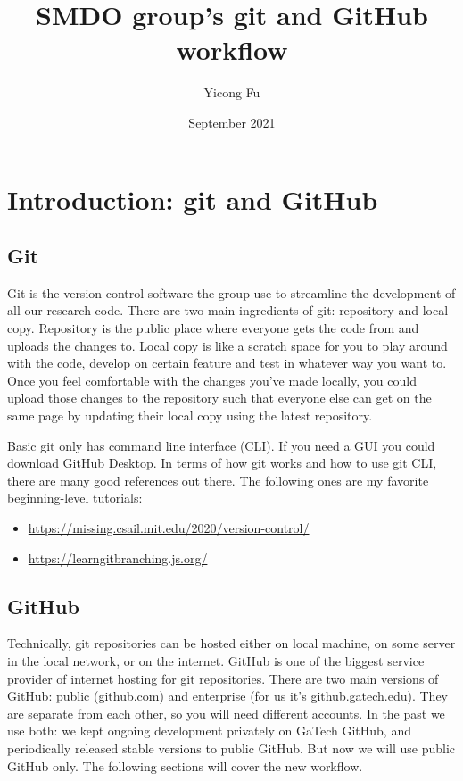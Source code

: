 \documentclass{article}
\title{SMDO group's git and GitHub workflow}
\author{Yicong Fu}
\date{September 2021}
\begin{document}
\maketitle

\section{Introduction: git and GitHub}

\subsection{Git}
Git is the version control software the group use to streamline the development of all our research code.
There are two main ingredients of git: repository and local copy.
Repository is the public place where everyone gets the code from and uploads the changes to.
Local copy is like a scratch space for you to play around with the code, develop on certain feature and test
in whatever way you want to.
Once you feel comfortable with the changes you've made locally, you could upload those changes to the
repository such that everyone else can get on the same page by updating their local copy using the latest repository.

Basic git only has command line interface (CLI).
If you need a GUI you could download GitHub Desktop.
In terms of how git works and how to use git CLI, there are many good references out there. The following ones are my favorite beginning-level tutorials:

\begin{itemize}
    \item \href{https://missing.csail.mit.edu/2020/version-control/}{https://missing.csail.mit.edu/2020/version-control/}
    \item \href{https://learngitbranching.js.org/}{https://learngitbranching.js.org/}
\end{itemize}

\subsection{GitHub}

Technically, git repositories can be hosted either on local machine, on some server in the local network, or
on the internet.
GitHub is one of the biggest service provider of internet hosting for git repositories.
There are two main versions of GitHub: public (github.com) and enterprise (for us it's github.gatech.edu).
They are separate from each other, so you will need different accounts.
In the past we use both: we kept ongoing development privately on GaTech GitHub, and periodically
released stable versions to public GitHub.
But now we will use public GitHub only.
The following sections will cover the new workflow.
\end{document}
